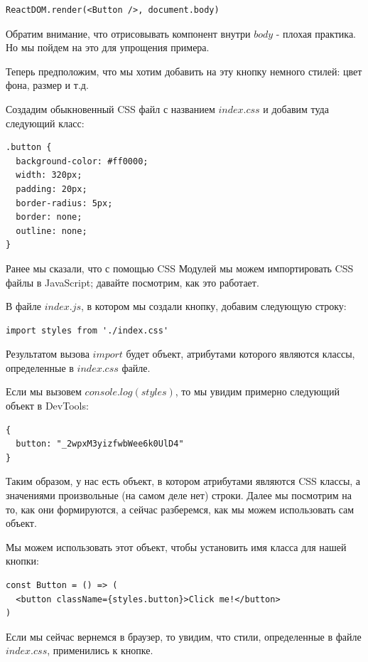 \begin{lstlisting}
ReactDOM.render(<Button />, document.body)
\end{lstlisting}

Обратим внимание, что отрисовывать компонент внутри $body$ - плохая практика. Но мы пойдем на это для упрощения примера.

Теперь предположим, что мы хотим добавить на эту кнопку немного стилей: цвет фона, размер и т.д.

Создадим обыкновенный CSS файл с названием $index.css$ и добавим туда следующий класс:

\begin{lstlisting}
.button {
  background-color: #ff0000;
  width: 320px;
  padding: 20px;
  border-radius: 5px;
  border: none;
  outline: none;
}
\end{lstlisting}

Ранее мы сказали, что с помощью CSS Модулей мы можем импортировать CSS файлы в JavaScript; давайте посмотрим, как это работает.

В файле $index.js$, в котором мы создали кнопку, добавим следующую строку:

\begin{lstlisting}
import styles from './index.css'
\end{lstlisting}

Результатом вызова $import$ будет объект, атрибутами которого являются классы, определенные в $index.css$ файле.

Если мы вызовем $console.log (styles)$, то мы увидим примерно следующий объект в DevTools:

\begin{lstlisting}
{
  button: "_2wpxM3yizfwbWee6k0UlD4"
}
\end{lstlisting}

Таким образом, у нас есть объект, в котором атрибутами являются CSS классы, а значениями произвольные (на самом деле нет) строки. Далее мы посмотрим на то, как они формируются, а сейчас разберемся, как мы можем использовать сам объект.

Мы можем использовать этот объект, чтобы установить имя класса для нашей кнопки:

\begin{lstlisting}
const Button = () => (
  <button className={styles.button}>Click me!</button>
)
\end{lstlisting}

Если мы сейчас вернемся в браузер, то увидим, что стили, определенные в файле $index.css$, применились к кнопке.

